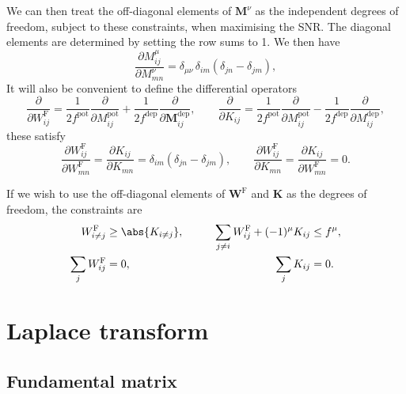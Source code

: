 \documentclass[12pt]{article}
\newcommand{\Wm}{W}
\newcommand{\W}{\mathbf{\Wm}}
\newcommand{\MMdm}{M}
\newcommand{\MMd}{\mathbf{\MMdm}}
\newcommand{\encm}{K}
\newcommand{\enc}{\mathbf{\encm}}
\newcommand{\frgm}{\Wm^{\mathrm{F}}}
\newcommand{\frg}{\W^{\mathrm{F}}}
\newcommand{\pot}{^{\text{pot}}}
\newcommand{\dep}{^{\text{dep}}}
\renewcommand{\pdiff}[2]{\frac{\partial #1}{\partial #2}}
\begin{document}
We can then treat the off-diagonal elements of \(\MMd^\nu\) as the independent degrees of freedom, subject to these constraints, when maximising the SNR.
The diagonal elements are determined by setting the row sums to 1.
We then have
%
\begin{equation}\label{eq:derivpd}
  \pdiff{\MMdm^\mu_{ij}}{\MMdm^\nu_{mn}} 
      = \delta_{\mu\nu}\, \delta_{im}(\delta_{jn}-\delta_{jm}),
\end{equation}
%
It will also be convenient to define the differential operators
%
\begin{equation}\label{eq:pertfe}
  \pdiff{}{\frgm_{ij}} = \frac{1}{2f\pot} \pdiff{}{\MMdm \pot_{ij}} + \frac{1}{2f\dep} \pdiff{}{\MMd \dep_{ij}},
  \qquad
  \pdiff{}{\encm_{ij}} = \frac{1}{2f\pot} \pdiff{}{\MMdm \pot_{ij}} - \frac{1}{2f\dep} \pdiff{}{\MMdm \dep_{ij}},
\end{equation}
%
these satisfy
%
\begin{equation}\label{eq:derivfe}
  \pdiff{\frgm_{ij}}{\frgm_{mn}} = \pdiff{\encm_{ij}}{\encm_{mn}} = \delta_{im}(\delta_{jn}-\delta_{jm}),
  \qquad
  \pdiff{\frgm_{ij}}{\encm_{mn}} = \pdiff{\encm_{ij}}{\frgm_{mn}} = 0.
\end{equation}
%

If we wish to use the off-diagonal elements of \(\frg\) and \(\enc\) as the degrees of freedom, the constraints are
%
\begin{equation}\label{eq:constrfe}
\begin{aligned}
  \frgm_{i \neq j}   &\geq \abs{ \encm_{i \neq j} }, &\qquad
  \sum_{j\neq i}\frgm_{ij} + (-1)^\mu \encm_{ij}  &\leq f^\mu, \\
  \sum_j \frgm_{ij} &=0, &
  \sum_j \encm_{ij} &=0.
\end{aligned}
\end{equation}
%



\section{Laplace transform}\label{sec:laplace}


\subsection{Fundamental matrix \etc}\label{sec:lfund}
\end{document}
